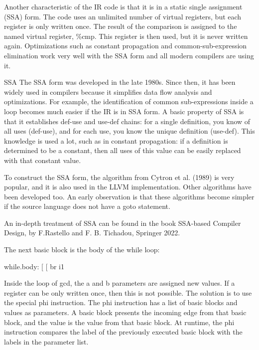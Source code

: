 Another characteristic of the IR code is that it is in a static single assignment (SSA) form. The code uses an unlimited number of virtual registers, but each register is only written once. The result of the comparison is assigned to the named virtual register, \%cmp. This register is then used, but it is never written again. Optimizations such as constant propagation and common-sub-expression elimination work very well with the SSA form and all modern compilers are using it.

\begin{myTip}{SSA}
The SSA form was developed in the late 1980s. Since then, it has been widely used in compilers because it simplifies data flow analysis and optimizations. For example, the identification of common sub-expressions inside a loop becomes much easier if the IR is in SSA form. A basic property of SSA is that it establishes def-use and use-def chains: for a single definition, you know of all uses (def-use), and for each use, you know the unique definition (use-def). This knowledge is used a lot, such as in constant propagation: if a definition is determined to be a constant, then all uses of this value can be easily replaced with that constant value.

To construct the SSA form, the algorithm from Cytron et al. (1989) is very popular, and it is also used in the LLVM implementation. Other algorithms have been developed too. An early observation is that these algorithms become simpler if the source language does not have a goto statement.

An in-depth treatment of SSA can be found in the book SSA-based Compiler Design, by F.Rastello and F. B. Tichadou, Springer 2022.
\end{myTip}

The next basic block is the body of the while loop:

\begin{shell}
while.body:
                        [ %
                        [ %
    br i1 %
\end{shell}

Inside the loop of gcd, the a and b parameters are assigned new values. If a register can be only written once, then this is not possible. The solution is to use the special phi instruction. The phi instruction has a list of basic blocks and values as parameters. A basic block presents the incoming edge from that basic block, and the value is the value from that basic block. At runtime, the phi instruction compares the label of the previously executed basic block with the labels in the parameter list.

